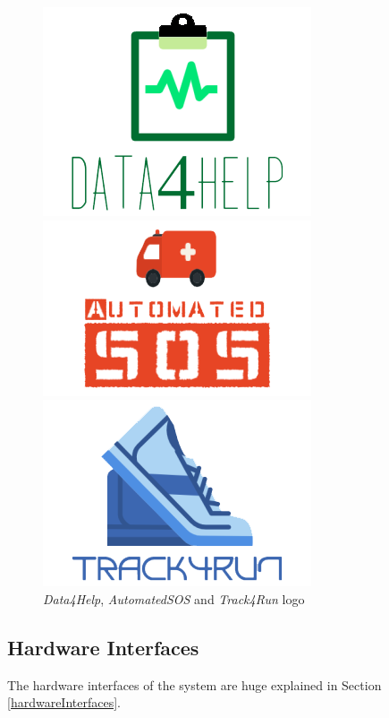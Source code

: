 \begin{figure}[H]
\begin{minipage}{.3\textwidth}
\centering
\includegraphics[scale=.3]{img/mockup/d4h.png}
\end{minipage}
\begin{minipage}{.3\textwidth}
\centering
\includegraphics[scale=.3]{img/mockup/sos.png}
\end{minipage}
\begin{minipage}{.3\textwidth}
\centering
\includegraphics[scale=.3]{img/mockup/t4r.png}
\end{minipage}
\hspace{0.05\linewidth}
\centering
\caption{\textit{Data4Help}, \textit{AutomatedSOS} and \textit{Track4Run} logo}
\label{img:logos}
\end{figure}


\subsection{Hardware Interfaces}
The hardware interfaces of the system are huge explained in Section \ref{hardwareInterfaces}.

